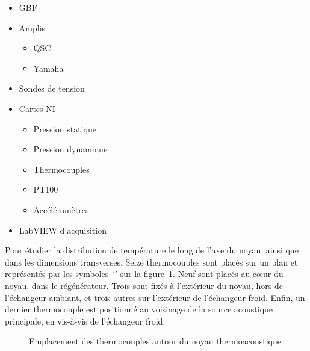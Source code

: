 %    

\begin{itemize}
    \item GBF
    \item Amplis
    \begin{itemize}
        \item QSC
        \item Yamaha
    \end{itemize}
    \item Sondes de tension
    \item Cartes NI
    \begin{itemize}
        \item Pression statique
        \item Pression dynamique
        \item Thermocouples
        \item PT100
        \item Accéléromètres
    \end{itemize}
    \item LabVIEW d'acquisition
\end{itemize}

Pour étudier la distribution de température le long de l'axe du noyau, ainsi que dans les dimensions transverses, Seize thermocouples sont placés sur un plan et représentés par les symboles~`\textcolor{cyan}{\textbullet}' sur la figure~\ref{fig:TCdansNoyau}. Neuf sont placés au c\oe{}ur du noyau, dans le régénérateur. Trois sont fixés à l'extérieur du noyau, hors de l'échangeur ambiant, et trois autres sur l'extérieur de l'échangeur froid. Enfin, un dernier thermocouple est positionné au voisinage de la source acoustique principale, en vis-à-vis de l'échangeur froid.

\begin{figure}[!ht]
    \centering
    
    \caption{Emplacement des thermocouples autour du noyau thermoacoustique}
    \label{fig:TCdansNoyau}
\end{figure}

%
%    

